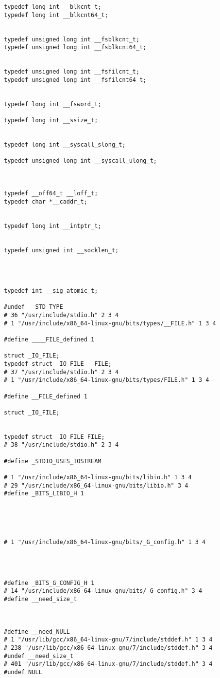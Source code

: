\documentclass[11pt]{article}
\begin{document}
\begin{verbatim}
typedef long int __blkcnt_t;
typedef long int __blkcnt64_t;


typedef unsigned long int __fsblkcnt_t;
typedef unsigned long int __fsblkcnt64_t;


typedef unsigned long int __fsfilcnt_t;
typedef unsigned long int __fsfilcnt64_t;


typedef long int __fsword_t;

typedef long int __ssize_t;


typedef long int __syscall_slong_t;

typedef unsigned long int __syscall_ulong_t;



typedef __off64_t __loff_t;
typedef char *__caddr_t;


typedef long int __intptr_t;


typedef unsigned int __socklen_t;




typedef int __sig_atomic_t;

#undef __STD_TYPE
# 36 "/usr/include/stdio.h" 2 3 4
# 1 "/usr/include/x86_64-linux-gnu/bits/types/__FILE.h" 1 3 4

#define ____FILE_defined 1

struct _IO_FILE;
typedef struct _IO_FILE __FILE;
# 37 "/usr/include/stdio.h" 2 3 4
# 1 "/usr/include/x86_64-linux-gnu/bits/types/FILE.h" 1 3 4

#define __FILE_defined 1

struct _IO_FILE;


typedef struct _IO_FILE FILE;
# 38 "/usr/include/stdio.h" 2 3 4

#define _STDIO_USES_IOSTREAM 

# 1 "/usr/include/x86_64-linux-gnu/bits/libio.h" 1 3 4
# 29 "/usr/include/x86_64-linux-gnu/bits/libio.h" 3 4
#define _BITS_LIBIO_H 1





# 1 "/usr/include/x86_64-linux-gnu/bits/_G_config.h" 1 3 4




#define _BITS_G_CONFIG_H 1
# 14 "/usr/include/x86_64-linux-gnu/bits/_G_config.h" 3 4
#define __need_size_t 



#define __need_NULL 
# 1 "/usr/lib/gcc/x86_64-linux-gnu/7/include/stddef.h" 1 3 4
# 238 "/usr/lib/gcc/x86_64-linux-gnu/7/include/stddef.h" 3 4
#undef __need_size_t
# 401 "/usr/lib/gcc/x86_64-linux-gnu/7/include/stddef.h" 3 4
#undef NULL





\end{verbatim}
\end{document}
